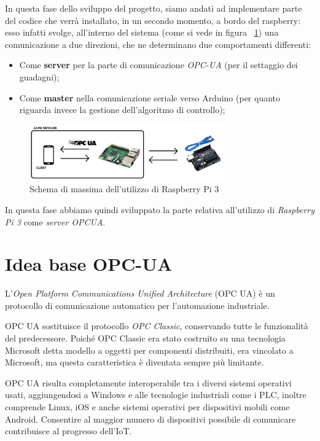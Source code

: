 In questa fase dello sviluppo del progetto, siamo andati ad implementare parte del codice che verrà installato, in un secondo momento, a bordo del raspberry: esso infatti svolge, all'interno del sistema (come si vede in figura ~\ref{fig:OPCUA_schema}) una comunicazione a due direzioni, che ne determinano due comportamenti differenti:
\begin{itemize}
	\item Come \textbf{server} per la parte di comunicazione \textit{OPC-UA} (per il settaggio dei guadagni);
	\item Come \textbf{master} nella comunicazione seriale verso Arduino (per quanto riguarda invece la gestione dell'algoritmo di controllo);
\end{itemize}

 \begin{figure}[H]
	\centering   	
	\includegraphics[width=0.75\textwidth]{Immagini/OPCUA_schema.png}
	\caption{Schema di massima dell'utilizzo di Raspberry Pi 3}
	\label{fig:OPCUA_schema}
\end{figure}

In questa fase abbiamo quindi sviluppato la parte relativa all'utilizzo di \textit{Raspberry Pi 3} come \textit{server OPCUA}.

\section{Idea base OPC-UA}
L'\textit{Open Platform Communications Unified Architecture} (OPC UA) è un protocollo di comunicazione automatico per l'automazione industriale. 

OPC UA sostituisce il protocollo \textit{OPC Classic}, conservando tutte le funzionalità del predecessore. Poiché OPC Classic era stato costruito su una tecnologia Microsoft detta modello a oggetti per componenti distribuiti, era vincolato a Microsoft, ma questa caratteristica è diventata sempre più limitante.

OPC UA risulta completamente interoperabile tra i diversi sistemi operativi usati, aggiungendosi a Windows e alle tecnologie industriali come i PLC, inoltre comprende Linux, iOS e anche sistemi operativi per dispositivi mobili come Android. Consentire al maggior numero di dispositivi possibile di comunicare contribuisce al progresso dell'IoT.


